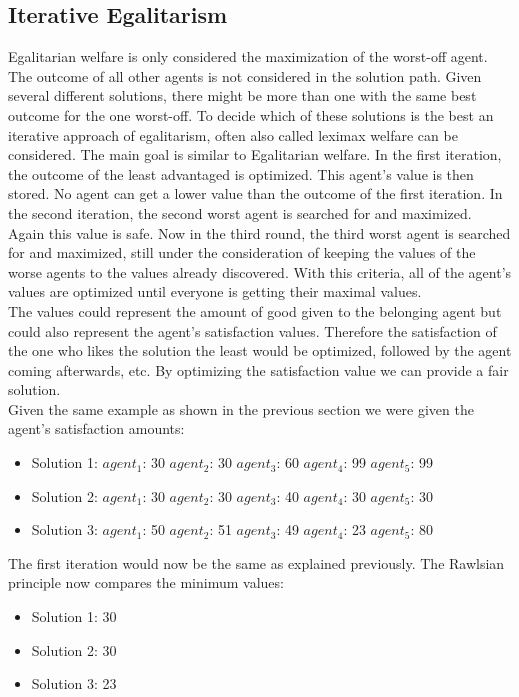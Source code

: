 \documentclass[german, a4paper, 11pt, oneside]{scrbook}
\begin{document}
\subsection{Iterative Egalitarism}
Egalitarian welfare is only considered the maximization of the worst-off agent. The outcome of all other agents is not considered in the solution path. Given several different solutions, there might be more than one with the same best outcome for the one worst-off. To decide which of these solutions is the best an iterative approach of egalitarism, often also called leximax welfare can be considered. The main goal is similar to Egalitarian welfare. In the first iteration, the outcome of the least advantaged is optimized. This agent's value is then stored. No agent can get a lower value than the outcome of the first iteration. In the second iteration, the second worst agent is searched for and maximized. Again this value is safe. Now in the third round, the third worst agent is searched for and maximized, still under the consideration of keeping the values of the worse agents to the values already discovered. With this criteria, all of the agent's values are optimized until everyone is getting their maximal values. \cite{.,FelixBrandtVincentConitzerUlleEndrissJeromeLangandArielD.Procaccia.,Chen.2020} \\The values could represent the amount of good given to the belonging agent but could also represent the agent's satisfaction values. Therefore the satisfaction of the one who likes the solution the least would be optimized, followed by the agent coming afterwards, etc. By optimizing the satisfaction value we can provide a fair solution.
\\Given the same example as shown in the previous section we were given the agent's satisfaction amounts:
\begin{itemize}
\item Solution 1: $agent_1$: 30 $agent_2$: 30  $agent_3$: 60 $agent_4$: 99 $agent_5$: 99
\item Solution 2: $agent_1$: 30 $agent_2$: 30  $agent_3$: 40 $agent_4$: 30 $agent_5$: 30
\item Solution 3: $agent_1$: 50 $agent_2$: 51  $agent_3$: 49 $agent_4$: 23 $agent_5$: 80
\end{itemize}
The first iteration would now be the same as explained previously.
The Rawlsian principle now compares the minimum values:
\begin{itemize}
\item Solution 1: 30 
\item Solution 2: 30 
\item Solution 3: 23
\end{itemize}
\end{document}
